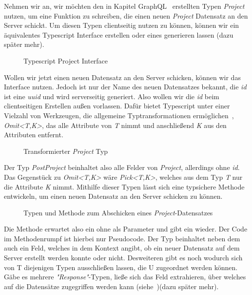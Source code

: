 Nehmen wir an, wir möchten den in Kapitel GraphQL~ erstellten Typen \emph{Project} nutzen,
um eine Funktion zu schreiben, die einen neuen \emph{Project} Datensatz an den Server schickt. Um diesen Typen clientseitig nutzen zu können,
können wir ein äquivalentes Typescript Interface erstellen oder eines generieren lassen (dazu später mehr).

\begin{figure}[h]
    
    \caption{Typescript Project Interface}
    \label{fig:basics:typescript:3}
\end{figure}

Wollen wir jetzt einen neuen Datensatz an den Server schicken, können wir das Interface nutzen. Jedoch ist nur der Name des neuen Datensatzes bekannt,
die \emph{id} ist eine \emph{uuid} und wird serverseitig generiert. Also wollen wir die \emph{id} beim clientseitigen Erstellen außen vorlassen.
Dafür bietet Typescript unter einer Vielzahl von Werkzeugen, die allgemeine Typtransformationen ermöglichen~\cite{typescript-utility-types},
\emph{Omit<T,K>}, das alle Attribute von \emph{T} nimmt und anschließend \emph{K} aus den Attributen entfernt.

\begin{figure}[h]
    
    \caption{Transformierter \emph{Project} Typ}
    \label{fig:basics:typescript:4}
\end{figure}

Der Typ \emph{PostProject} beinhaltet also alle Felder von \emph{Project}, allerdings ohne \emph{id}. Das Gegenstück zu \emph{Omit<T,K>} wäre \emph{Pick<T,K>},
welches aus dem Typ \emph{T} nur die Attribute \emph{K} nimmt. Mithilfe dieser Typen lässt sich eine typsichere Methode entwickeln,
um einen neuen Datensatz an den Server schicken zu können.

\begin{figure}[h]
    
    \caption{Typen und Methode zum Abschicken eines \emph{Project}-Datensatzes}
    \label{fig:basics:typescript:5}
\end{figure}

Die Methode  erwartet also ein  ohne  als Parameter und gibt ein  wieder.
Der Code im Methodenrumpf ist hierbei nur Pseudocode. Der Typ  beinhaltet neben dem  auch ein  Feld,
welches in dem Kontext angibt, ob ein neuer Datensatz auf dem Server erstellt werden konnte oder nicht.
Desweiteren gibt es noch  wodurch sich von T diejenigen Typen ausschließen lassen,
die U zugeordnet werden können. Gäbe es mehrere \emph{"Response"}-Typen, ließe sich das Feld extrahieren,
über welches auf die Datensätze zugegriffen werden kann (siehe~)(dazu später mehr).

